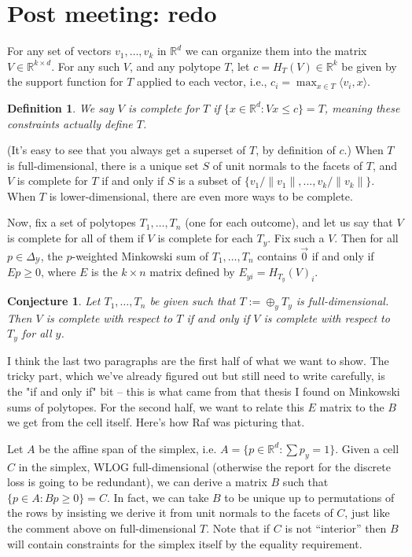 \documentclass[12pt]{article}
\newcommand{\reals}{\mathbb{R}}
\newcommand{\simplex}{\Delta_\Y}
\newcommand{\Y}{\mathcal{Y}}
\newcommand{\inprod}[2]{\langle #1, #2 \rangle}%
\newtheorem{definition}{Definition}
\newtheorem{conjecture}{Conjecture}
\begin{document}
\newpage

\section{Post meeting: redo}

  For any set of vectors $v_1, \ldots, v_k$ in $\reals^d$ we can organize them into the matrix $V \in \reals^{k \times d}$.  
  For any such $V$, and any polytope $T$, let $c = H_T(V) \in \reals^k$ be given by the support function for $T$ applied to each vector, i.e., $c_i = \max_{x \in T} \inprod {v_i}{x}$.  
  \begin{definition}
  	We say $V$ is \emph{complete} for $T$ if $\{x \in \reals^d : Vx \leq c\} = T$, meaning these constraints actually define $T$.   
  \end{definition}
  (It's easy to see that you always get a superset of $T$, by definition of $c$.) 
  When $T$ is full-dimensional, there is a unique set $S$ of unit normals to the facets of $T$, and $V$ is complete for $T$ if and only if $S$ is a subset of $\{v_1/\|v_1\|,...,v_k/\|v_k\| \}$.  
  When $T$ is lower-dimensional, there are even more ways to be complete.

  Now, fix a set of polytopes $T_1, \ldots, T_n$ (one for each outcome), and let us say that $V$ is complete for all of them if $V$ is complete for each $T_y$.  
  Fix such a $V$.  
  Then for all $p \in \simplex$, the $p$-weighted Minkowski sum of $T_1, \ldots, T_n$ contains $\vec 0$ if and only if $E p \geq 0$, where $E$ is the $k \times n$ matrix defined by $E_{yi} = H_{T_y}(V)_i$.

  \begin{conjecture}
	Let $T_1, \ldots, T_n$ be given such that $T := \oplus_y T_y$ is full-dimensional.
	Then $V$ is complete with respect to $T$ if and only if $V$ is complete with respect to $T_y$ for all $y$.
  \end{conjecture}

  I think the last two paragraphs are the first half of what we want to show.  
  The tricky part, which we've already figured out but still need to write carefully, is the "if and only if" bit -- this is what came from that thesis I found on Minkowski sums of polytopes.  
  For the second half, we want to relate this $E$ matrix to the $B$ we get from the cell itself.  
  Here's how Raf was picturing that.


  Let $A$ be the affine span of the simplex, i.e. $A = \{p \in \reals^d : \sum p_y = 1\}$.  
  Given a cell $C$ in the simplex, WLOG full-dimensional (otherwise the report for the discrete loss is going to be redundant), we can derive a matrix $B$ such that $\{p \in A : B p \geq 0\} = C$.  
  In fact, we can take $B$ to be unique up to permutations of the rows by insisting we derive it from unit normals to the facets of $C$, just like the comment above on full-dimensional $T$.  
  Note that if $C$ is not ``interior'' then $B$ will contain constraints for the simplex itself by the equality requirement.
\end{document}
